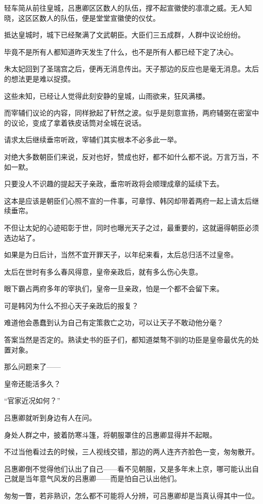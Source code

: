 轻车简从前往皇城，吕惠卿区区数人的队伍，撑不起宣徽使的凛凛之威。无人知晓，这区区数人的队伍，便是堂堂宣徽使的仪仗。

抵达皇城时，城下已经聚满了文武朝臣。大臣们三五成群，人群中议论纷纷。

毕竟不是所有人都知道昨天发生了什么，也不是所有人都已经下定了决心。

朱太妃回到了圣瑞宫之后，便再无消息传出。天子那边的反应也是毫无消息。太后的想法更是难以捉摸。

这些未知，已经让人觉得此刻安静的皇城，山雨欲来，狂风满楼。

而宰辅们议论的内容，同样掀起了轩然之波。似乎是刻意宣扬，两府辅弼在密室中的议论，变成了拿着铁皮话筒对全城在说话。

请求太后继续垂帘听政，宰辅们其实根本不必多此一举。

对绝大多数朝臣们来说，反对也好，赞成也好，都不如什么都不说。万言万当，不如一默。

只要没人不识趣的提起天子亲政，垂帘听政将会顺理成章的延续下去。

这本是应该是朝臣们心照不宣的一件事，可章惇、韩冈却带着两府一起上请太后继续垂帘。

不但让太妃的心迹昭彰于世，同时也曝光天子之过，最重要的，这就逼得朝臣必须选边站了。

如果是为日后计，当然不宜开罪天子，以年纪来看，太后总归活不过皇帝。

太后在世时有多么春风得意，皇帝亲政后，就有多么伤心失意。

眼下霸占两府多年的宰执们，皇帝一旦亲政，怕是一个都不会留下来。

可是韩冈为什么不担心天子亲政后的报复？

难道他会愚蠢到认为自己有定策救亡之功，可以让天子不敢动他分毫？

答案当然是否定的。熟读史书的臣子们，都知道桀骜不驯的功臣是皇帝最优先的处置对象。

那么问题来了——

皇帝还能活多久？

“官家近况如何？”

吕惠卿就听到身边有人在问。

身处人群之中，披着防寒斗篷，将朝服罩住的吕惠卿显得并不起眼。

不过当他看过去的时候，三人视线交错，那边的两人连齐齐脸色一变，匆匆散开。

吕惠卿倒不觉得他们认出了自己——看不见朝服，又是多年未上京，哪可能认出自己就是当年意气风发的吕惠卿——而是怕自己认出他们。

匆匆一瞥，若非熟识，怎么都不可能将人分辨，可吕惠卿却是当真认得其中一位。


